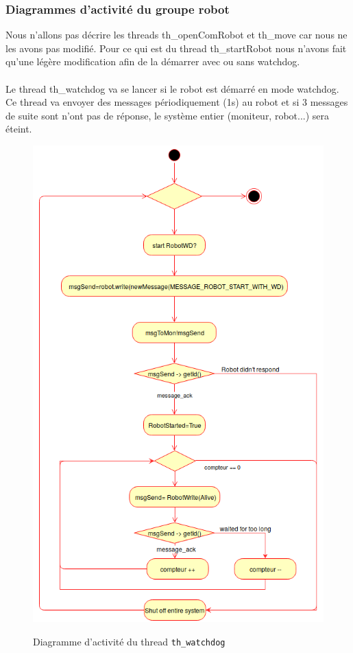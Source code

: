 \documentclass[11pt, a4paper]{paper}
\begin{document}
\subsubsection{Diagrammes d'activité du groupe robot}
{Nous n'allons pas décrire les threads th\_openComRobot et th\_move car nous ne les avons pas modifié. Pour ce qui est du thread th\_startRobot nous n'avons fait qu'une légère modification afin de la démarrer avec ou sans watchdog.}\\ \\

{Le thread th\_watchdog va se lancer si le robot est démarré en mode watchdog. Ce thread va envoyer des messages périodiquement (1s) au robot et si 3 messages de suite sont n'ont pas de réponse, le système entier (moniteur, robot...) sera éteint.}

\begin{figure}[htbp]
\label{fig:act_envoyer}
\begin{center}
{\includegraphics[scale=.3]{./dossier_conception/th_watchdog}}
{\caption{Diagramme d'activité du thread {\tt th\_watchdog}}}
\end{center}
\end{figure}
\FloatBarrier
\end{document}
